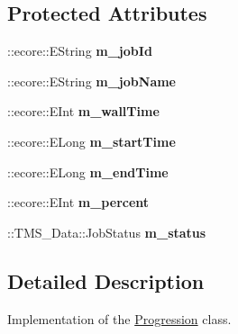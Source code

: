 \subsection*{Protected Attributes}
\begin{DoxyCompactItemize}
\item 
\hypertarget{classTMS__Data_1_1Progression_a1fcb0d5572437482a576347eb0d39cb7}{
::ecore::EString {\bfseries m\_\-jobId}}
\label{classTMS__Data_1_1Progression_a1fcb0d5572437482a576347eb0d39cb7}

\item 
\hypertarget{classTMS__Data_1_1Progression_a75f865d09cb4fc24c5a48f5945b5d000}{
::ecore::EString {\bfseries m\_\-jobName}}
\label{classTMS__Data_1_1Progression_a75f865d09cb4fc24c5a48f5945b5d000}

\item 
\hypertarget{classTMS__Data_1_1Progression_ad5830549fddf915aec03c5efe899c186}{
::ecore::EInt {\bfseries m\_\-wallTime}}
\label{classTMS__Data_1_1Progression_ad5830549fddf915aec03c5efe899c186}

\item 
\hypertarget{classTMS__Data_1_1Progression_a642bae49acbfc7a7008fbbe577b5c3b5}{
::ecore::ELong {\bfseries m\_\-startTime}}
\label{classTMS__Data_1_1Progression_a642bae49acbfc7a7008fbbe577b5c3b5}

\item 
\hypertarget{classTMS__Data_1_1Progression_a78e2176cbde284fd53a81b2e32c8bda8}{
::ecore::ELong {\bfseries m\_\-endTime}}
\label{classTMS__Data_1_1Progression_a78e2176cbde284fd53a81b2e32c8bda8}

\item 
\hypertarget{classTMS__Data_1_1Progression_a20b22d832fa5e93000499abdaf831122}{
::ecore::EInt {\bfseries m\_\-percent}}
\label{classTMS__Data_1_1Progression_a20b22d832fa5e93000499abdaf831122}

\item 
\hypertarget{classTMS__Data_1_1Progression_a1681f275de834567ac083114ab1506cf}{
::TMS\_\-Data::JobStatus {\bfseries m\_\-status}}
\label{classTMS__Data_1_1Progression_a1681f275de834567ac083114ab1506cf}

\end{DoxyCompactItemize}


\subsection{Detailed Description}
Implementation of the \hyperlink{classTMS__Data_1_1Progression}{Progression} class. 

